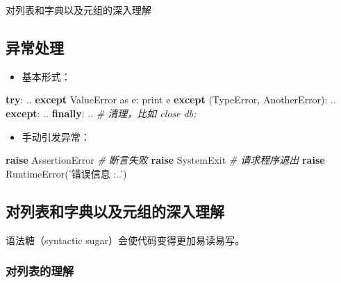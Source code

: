\documentclass[]{article}
\newenvironment{Shaded}{}{}
\newcommand{\StringTok}[1]{\textcolor[rgb]{0.25,0.44,0.63}{#1}}
\newcommand{\ImportTok}[1]{#1}
\newcommand{\CommentTok}[1]{\textcolor[rgb]{0.38,0.63,0.69}{\textit{#1}}}
\newcommand{\ControlFlowTok}[1]{\textcolor[rgb]{0.00,0.44,0.13}{\textbf{#1}}}
\newcommand{\BuiltInTok}[1]{#1}
\newcommand{\PreprocessorTok}[1]{\textcolor[rgb]{0.74,0.48,0.00}{#1}}
\newcommand{\NormalTok}[1]{#1}
\begin{document}
对列表和字典以及元组的深入理解

\hypertarget{header-n357}{\subsection{异常处理}\label{header-n357}}

\begin{itemize}
\item
  基本形式：
\end{itemize}

\begin{Shaded}
\begin{Highlighting}[]
\ControlFlowTok{try}\NormalTok{:}
\NormalTok{  ..}
\ControlFlowTok{except} \PreprocessorTok{ValueError} \ImportTok{as}\NormalTok{ e:}
  \BuiltInTok{print}\NormalTok{ e}
\ControlFlowTok{except}\NormalTok{ (}\PreprocessorTok{TypeError}\NormalTok{, AnotherError):}
\NormalTok{  ..}
\ControlFlowTok{except}\NormalTok{:}
\NormalTok{  ..}
\ControlFlowTok{finally}\NormalTok{:}
\NormalTok{  .. }\CommentTok{# 清理，比如 close db;}
\end{Highlighting}
\end{Shaded}

\begin{itemize}
\item
  手动引发异常：
\end{itemize}

\begin{Shaded}
\begin{Highlighting}[]
\ControlFlowTok{raise} \PreprocessorTok{AssertionError} \CommentTok{# 断言失败}
\ControlFlowTok{raise} \PreprocessorTok{SystemExit}
\CommentTok{# 请求程序退出}
\ControlFlowTok{raise} \PreprocessorTok{RuntimeError}\NormalTok{(}\StringTok{'错误信息 :..'}\NormalTok{)}
\end{Highlighting}
\end{Shaded}

\hypertarget{header-n369}{\subsection{对列表和字典以及元组的深入理解}\label{header-n369}}

语法糖（syntactic sugar）会使代码变得更加易读易写。

\subsubsection{对列表的理解}\label{header-n372}
\end{document}
